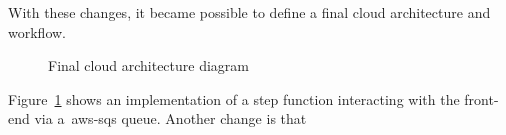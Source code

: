 With these changes, it became possible to define a final cloud architecture and workflow.

\begin{figure}[!htb]
    \minipage{\textwidth}
    
    \caption{Final cloud architecture diagram}\label{fig:final_design}
    \endminipage\hfill
\end{figure}

Figure~\ref{fig:final_design} shows an implementation of a step function
interacting with the front-end via a~\gls{aws-sqs} queue.
Another change is that